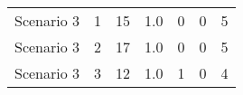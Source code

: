 {\begin{tabular}{lllllll}
	Scenario 3 & 1             & 15                 & 1.0          & 0                                                                          & 0					& 5                                                                                \\
	Scenario 3 & 2             & 17                 & 1.0          & 0                                                                          & 0					& 5                                                                                \\
	Scenario 3 & 3             & 12                 & 1.0          & 1                                                                          & 0					& 4                                                                                 \\
	\bottomrule
\end{tabular}

\vspace{1cm}
}
